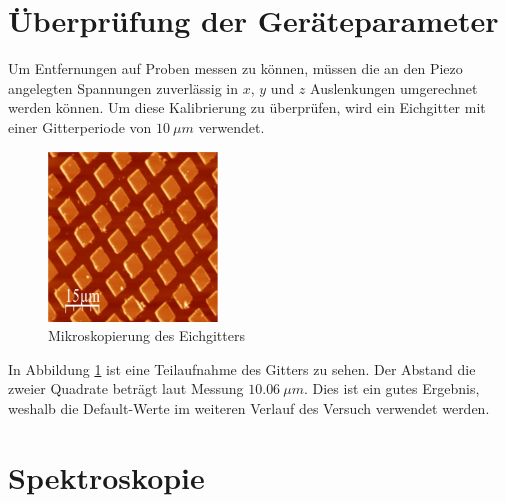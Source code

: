     \section{Überprüfung der Geräteparameter}

Um Entfernungen auf Proben messen zu können, müssen die an den Piezo angelegten 
Spannungen zuverlässig in $x$, $y$ und $z$ Auslenkungen umgerechnet werden können.
Um diese Kalibrierung zu überprüfen, wird ein Eichgitter mit einer Gitterperiode
von  $\SI{10}{\mu m}$ verwendet.
\begin{figure}[hb]
    \centering
    \includegraphics[width=0.4\textwidth]{Mess/gitter_aso.pdf}
    \caption{Mikroskopierung des Eichgitters}
    \label{gitter}
\end{figure}
In Abbildung \ref{gitter} ist eine Teilaufnahme des Gitters zu sehen. Der Abstand die 
zweier Quadrate beträgt laut Messung $\SI{10,06}{\mu m}$. Dies ist ein gutes 
Ergebnis, weshalb die Default-Werte im weiteren Verlauf des Versuch verwendet 
werden.

    \section{Spektroskopie}

